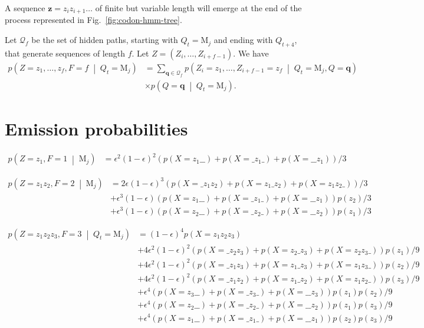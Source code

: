 \documentclass[a4paper]{article}
\theoremstyle{definition}
\theoremstyle{definition}
\newcommand{\cprob}[2]{p\left(#1\;\middle|\; #2\right)}
\newcommand{\eps}{\epsilon}
\newcommand{\s}{\texttt{\char`_}}
\begin{document}
A sequence $\mathbf z=z_i z_{i+1}\dots$ of finite but variable length will emerge at the end of the process represented in Fig.~\ref{fig:codon-hmm-tree}.

Let $\mathcal Q_f$ be the set of hidden paths, starting with $Q_t=\mathrm M_j$ and ending with $Q_{t+4}$,
that generate sequences of length $f$.
Let $Z=(Z_i, \dots, Z_{i+f-1})$.
We have
\begin{align*}
    \cprob{Z=z_1,\dots,z_f,F=f}{Q_t=\mathrm M_j} &= \sum_{\mathbf q \in \mathcal Q_f}
            \cprob{Z_i=z_1,\dots,Z_{i+f-1}=z_f}{Q_t=\mathrm M_j, Q=\mathbf q}\\
        &\times\cprob{Q=\mathbf q}{Q_t=\mathrm M_j}.
\end{align*}

\section{Emission probabilities}

\begin{align*}
    \cprob{Z=z_1,F=1}{\mathrm M_j}
        &= \eps^2(1-\eps)^2(p(X=z_1\s\s) + p(X=\s z_1\s) + p(X=\s\s z_1)) / 3
\end{align*}

\begin{align*}
    \cprob{Z=z_1z_2,F=2}{\mathrm M_j}
        &= 2\eps(1-\eps)^3(p(X=\s z_1z_2) + p(X=z_1\s z_2) + p(X=z_1z_2\s))/3\\
        &+ \eps^3(1-\eps)(p(X=z_1\s\s) + p(X=\s z_1\s) + p(X=\s\s z_1))p(z_2)/3\\
        &+ \eps^3(1-\eps)(p(X=z_2\s\s) + p(X=\s z_2\s) + p(X=\s\s z_2))p(z_1)/3
\end{align*}


\begin{align*}
    \cprob{Z=z_1z_2z_3,F=3}{Q_t=\mathrm M_j} &= (1-\eps)^4 p(X=z_1z_2z_3)\\
        &+ 4\eps^2(1-\eps)^2 (p(X=\s z_2 z_3) + p(X=z_2\s z_3) + p(X=z_2 z_3\s))p(z_1)/9\\
        &+ 4\eps^2(1-\eps)^2 (p(X=\s z_1 z_3) + p(X=z_1\s z_3) + p(X=z_1 z_3\s))p(z_2)/9\\
        &+ 4\eps^2(1-\eps)^2 (p(X=\s z_1 z_2) + p(X=z_1\s z_2) + p(X=z_1 z_2\s))p(z_3)/9\\
        &+ \eps^4 (p(X=z_3\s\s) + p(X=\s z_3\s) + p(X=\s\s z_3))p(z_1)p(z_2)/9\\
        &+ \eps^4 (p(X=z_2\s\s) + p(X=\s z_2\s) + p(X=\s\s z_2))p(z_1)p(z_3)/9\\
        &+ \eps^4 (p(X=z_1\s\s) + p(X=\s z_1\s) + p(X=\s\s z_1))p(z_2)p(z_3)/9
\end{align*}
\end{document}
